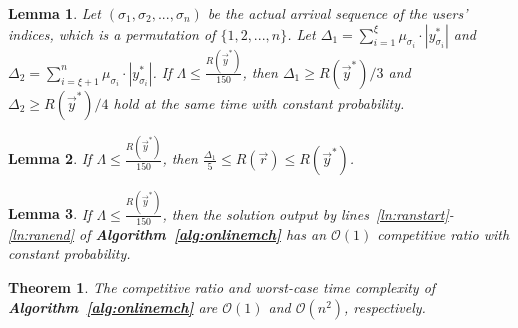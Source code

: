 \documentclass[10pt,journal,compsoc]{IEEEtran}
\newtheorem{theorem}{\textbf{Theorem}}
\newtheorem{lemma}{\textbf{Lemma}}
\begin{document}
  \begin{lemma}
    Let $(\sigma_1,\sigma_2,...,\sigma_n)$ be the actual arrival sequence of the users' indices, which is a permutation of $\{1,2,...,n\}$. Let $\Delta_1=\sum_{i=1}^\xi \mu_{\sigma_i}\cdot |y^*_{\sigma_i}|$ and $\Delta_2=\sum_{i=\xi+1}^n \mu_{\sigma_i}\cdot |y^*_{\sigma_i}|$. If $\Lambda \leq \frac{R(\vec{y}^*)}{150}$, then $\Delta_1\geq {R(\vec{y}^*)}/{3}$ and $\Delta_2\geq {R(\vec{y}^*)}/{4}$ hold at the same time with constant probability.
\label{lma:deltabound}
  \end{lemma}
\begin{lemma}
    If $\Lambda \leq \frac{R(\vec{y}^*)}{150}$, then $\frac{\Delta_1}{5}\leq R(\vec{r})\leq R(\vec{y}^*)$.
    \label{lma:boundapx}
  \end{lemma}
\begin{lemma}
    If $\Lambda \leq \frac{R(\vec{y}^*)}{150}$, then the solution output by lines~\ref{ln:ranstart}-\ref{ln:ranend} of \textbf{Algorithm~\ref{alg:onlinemch}} has an $\mathcal{O}(1)$ competitive ratio with constant probability.
  \label{lma:onlmchparta}
  \end{lemma}
\begin{theorem}
    The competitive ratio and worst-case time complexity of \textbf{Algorithm~\ref{alg:onlinemch}} are $\mathcal{O}(1)$ and $\mathcal{O}(n^2)$, respectively.
    \label{thm:artimcom}
  \end{theorem}
\end{document}
